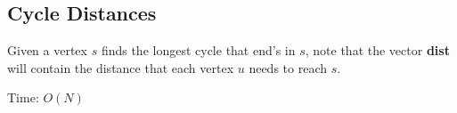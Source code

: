 \subsection{Cycle Distances}

Given a vertex $s$ finds the longest cycle that end's in $s$, note that the vector \textbf{dist} will contain the distance that each vertex $u$ needs to reach $s$.

Time: $O(N)$

